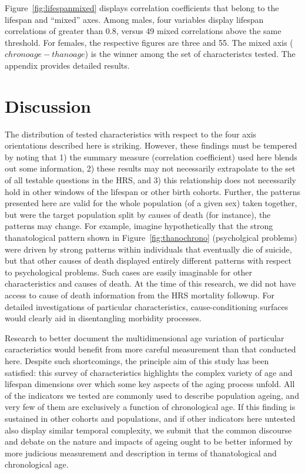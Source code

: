 \documentclass[11pt,oneside,a4paper]{article}
\begin{document}
\begin{figure}[!h]
{\begin{subfigure}{.7\textwidth}
	\end{subfigure}
	}
	
\end{figure}

Figure~\ref{fig:lifespanmixed} displays correlation coefficients
that belong to the lifespan and ``mixed'' axes. Among males, four variables
display lifespan correlations of greater than 0.8, versus 49 mixed correlations above
the same threshold. For females, the respective figures are three and 55. The
mixed axis ($chrono age - thano age$) is the winner among the set of
characteristcs tested. The appendix provides detailed results. 

\section*{Discussion}
The distribution of tested characteristics with respect to the
four axis orientations described here is striking. However, these findings
must be tempered by noting that 1) the summary measure (correlation coefficient)
used here blends out some information, 2) these results may
not necessarily extrapolate to the set of all testable questions in the HRS, and 3) this relationship does not necessarily hold in other windows of the lifespan or other birth cohorts. Further, the patterns
presented here are valid for the whole population (of a given sex) taken
together, but were the target population split by causes of death (for
instance), the patterns may change. For example, imagine hypothetically that the
strong thanatological pattern shown in Figure~\ref{fig:thanochrono}
(psycholgical problems) were driven by strong patterns within individuals that eventually
die of suicide, but that other causes of death displayed entirely different patterns with respect to
psychological problems. Such cases are easily imaginable for other
characteristics and causes of death. At the time of this research, we did not
have access to cause of death information from the HRS mortality followup. For
detailed investigations of particular characteristics, cause-conditioning
surfaces would clearly aid in disentangling morbidity processes.

Research to better document the multidimensional age variation of particular
caracteristics would benefit from more careful measurement than that conducted
here.
Despite such shortcomings, the principle aim of this study has been satisfied:
this survey of characteristics highlights the complex variety of age and
lifespan dimensions over which some key aspects of the aging process unfold. All
of the indicators we tested are commonly used to describe population ageing, and
very few of them are exclusively a function of chronological age. If this
finding is sustained in other cohorts and populations, and if other indicators
here untested also display similar temporal complexity, we submit that the
common discourse and debate on the nature and impacts of ageing ought to be
better informed by more judicious measurement and description in terms of
thanatological and chronological age.
\end{document}
